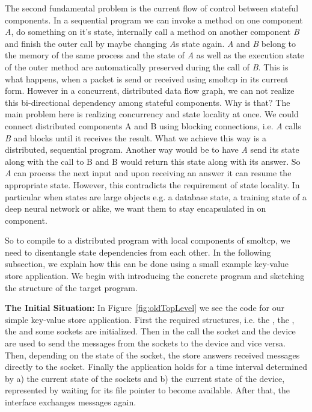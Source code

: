 The second fundamental problem is the current flow of control between stateful components. In a sequential program we can invoke a method on one component \emph{A}, do something on it's state, internally call a method on another component \emph{B} and finish the outer call by maybe changing \emph{A}s state again. \emph{A} and \emph{B} belong to the memory of the same process and the state of \emph{A} as well as the execution state of the outer method are automatically preserved during the call of \emph{B}.
This is what happens, when a packet is send or received using smoltcp in its current form. However in a concurrent, distributed data flow graph, we can not realize this bi-directional dependency among stateful components. Why is that? The main problem here is realizing concurrency and state locality at once. We could connect distributed components A and B using blocking connections, i.e. \emph{A} calls \emph{B} and blocks until it receives the result. What we achieve this way is a distributed, sequential program. Another way would be to have \emph{A} send its state along with the call to B and B would return this state along with its answer. So \emph{A} can process the next input and upon receiving an answer it can resume the appropriate state. However, this contradicts the requirement of state locality. In particular when states are large objects e.g. a database state, a training state of a deep neural network or alike, we want them to stay encapsulated in on component.\\

So to compile to a distributed program with local components of smoltcp, we need to disentangle state dependencies from each other. In the following subsection, we explain how this can be done using a small example key-value store application. We begin with introducing the concrete program and sketching the structure of the target program.

\textbf{The Initial Situation: } In Figure~\ref{fig:oldTopLevel} we see the code for our simple key-value store application. First the required structures, i.e. the , the , the  and some sockets are initialized. Then in the  call the socket and the device are used to send the messages from the sockets to the device and vice versa. Then, depending on the state of the socket, the store answers received messages directly to the socket. Finally the application holds for a time interval determined by a) the current state of the sockets  and b) the current state of the device, represented by waiting for its file pointer  to become available. After that, the interface exchanges messages again.


